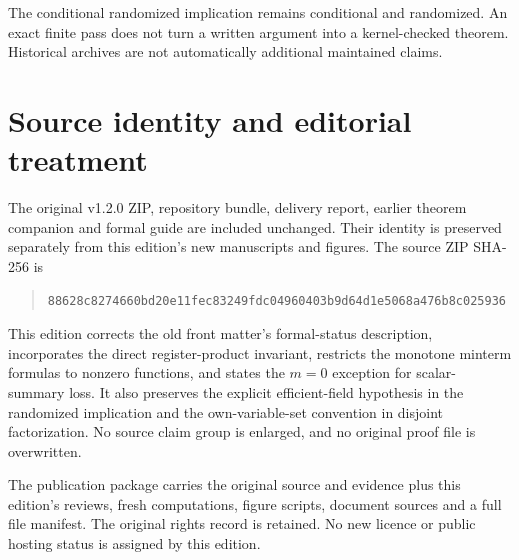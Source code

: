 \documentclass[11pt,letterpaper,oneside]{report}
\theoremstyle{komorebi}
\begin{document}
The conditional randomized implication remains conditional and randomized. An exact finite pass does not turn a written argument into a kernel-checked theorem. Historical archives are not automatically additional maintained claims.


\section{Source identity and editorial treatment}
The original v1.2.0 ZIP, repository bundle, delivery report, earlier theorem companion and formal guide are included unchanged. Their identity is preserved separately from this edition's new manuscripts and figures. The source ZIP SHA-256 is
\begin{quote}\footnotesize\nolinkurl{88628c8274660bd20e11fec83249fdc04960403b9d64d1e5068a476b8c025936}\end{quote}

This edition corrects the old front matter's formal-status description, incorporates the direct register-product invariant, restricts the monotone minterm formulas to nonzero functions, and states the $m=0$ exception for scalar-summary loss. It also preserves the explicit efficient-field hypothesis in the randomized implication and the own-variable-set convention in disjoint factorization. No source claim group is enlarged, and no original proof file is overwritten.

The publication package carries the original source and evidence plus this edition's reviews, fresh computations, figure scripts, document sources and a full file manifest. The original rights record is retained. No new licence or public hosting status is assigned by this edition.
\end{document}
